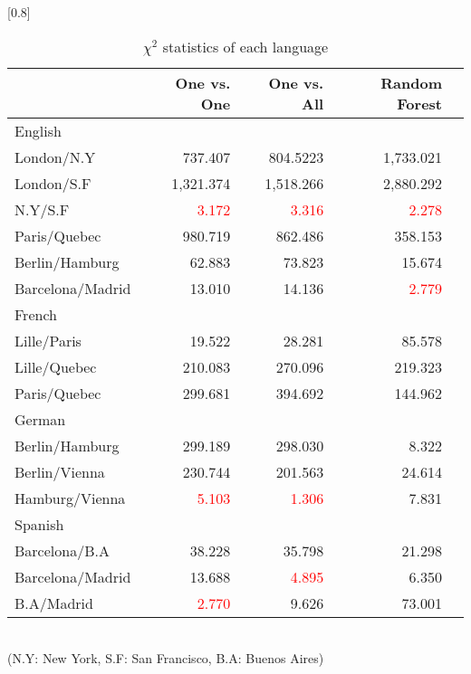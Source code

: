 \documentclass[twocolumn]{article}
\begin{document}
\begin{table}[ht]
	\caption{$\chi^2$ statistics of each language}
	\scalebox{0.7}[0.8]{
	\begin{tabular}{|l|r|r|r|r|} \hline
	{}&One vs. One&One vs. All&Random Forest\\ \hline \hline
	English&{} & {} & {} \\ \hline
	London/N.Y& 737.407 & 804.5223 &1,733.021 \\
	London/S.F& 1,321.374 &1,518.266& 2,880.292\\
	N.Y/S.F & \textcolor{red}{3.172}&\textcolor{red}{3.316}&\textcolor{red}{2.278} \\
	Paris/Quebec & 980.719& 862.486& 358.153\\
	Berlin/Hamburg & 62.883 & 73.823 & 15.674 \\
	Barcelona/Madrid & 13.010& 14.136 & \textcolor{red}{2.779} \\ \hline

	French &{} & {} & {} \\ \hline
	Lille/Paris & 19.522 &28.281& 85.578\\
	Lille/Quebec & 210.083 &270.096& 219.323\\
	Paris/Quebec & 299.681 &394.692& 144.962\\ \hline

	German &{} & {} & {} \\\hline
	Berlin/Hamburg& 299.189 &298.030&8.322 \\
	Berlin/Vienna& 230.744&201.563& 24.614\\
	Hamburg/Vienna& \textcolor{red}{5.103} &\textcolor{red}{1.306}& 7.831\\ \hline

	Spanish&{} & {} & {} \\\hline
	Barcelona/B.A& 38.228 & 35.798 & 21.298 \\
	Barcelona/Madrid & 13.688 & \textcolor{red}{4.895} & 6.350\\
	B.A/Madrid& \textcolor{red}{2.770} & 9.626 & 73.001\\ \hline

	\end{tabular}
	}
	\label{tab:result_chi_square}
	\\(N.Y: New York, S.F: San Francisco,  B.A: Buenos Aires)
\end{table}
\end{document}
